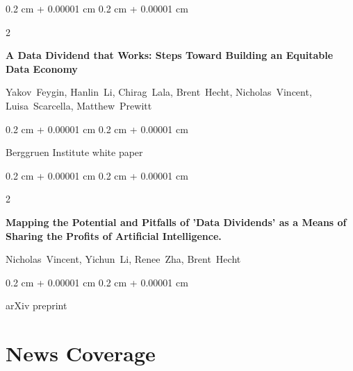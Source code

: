 \documentclass[10pt, letterpaper]{article}
\newenvironment{onecolentry}{
    \begin{adjustwidth}{
        0.2 cm + 0.00001 cm
    }{
        0.2 cm + 0.00001 cm
    }
}{
    \end{adjustwidth}
} %
\newenvironment{twocolentry}[2][]{
    \onecolentry
    \def\secondColumn{#2}
    \setcolumnwidth{\fill, 4.1 cm}
    \begin{paracol}{2}
}{
    \switchcolumn \raggedleft \secondColumn
    \end{paracol}
    \endonecolentry
} %
\begin{document}
        \begin{samepage}
            \begin{twocolentry}{
                2021
            }
                \textbf{A Data Dividend that Works: Steps Toward Building an Equitable Data Economy}

                \vspace{0.10 cm}

                \mbox{Yakov Feygin}, \mbox{Hanlin Li}, \mbox{Chirag Lala}, \mbox{Brent Hecht}, \mbox{Nicholas Vincent}, \mbox{Luisa Scarcella}, \mbox{Matthew Prewitt}
            \end{twocolentry}


            \vspace{0.10 cm}

            \begin{onecolentry}
        Berggruen Institute white paper    \end{onecolentry}
        \end{samepage}

        \vspace{0.2 cm}

        \begin{samepage}
            \begin{twocolentry}{
                2019
            }
                \textbf{Mapping the Potential and Pitfalls of 'Data Dividends' as a Means of Sharing the Profits of Artificial Intelligence.}

                \vspace{0.10 cm}

                \mbox{Nicholas Vincent}, \mbox{Yichun Li}, \mbox{Renee Zha}, \mbox{Brent Hecht}
            \end{twocolentry}


            \vspace{0.10 cm}

            \begin{onecolentry}
        arXiv preprint    \end{onecolentry}
        \end{samepage}


    
    \section{News Coverage}
\end{document}
